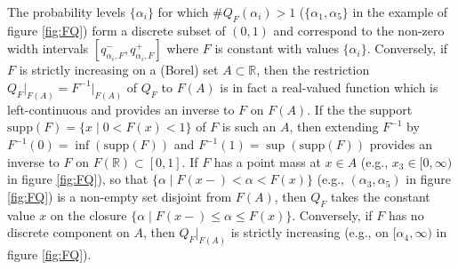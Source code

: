 \documentclass{article}\usepackage[]{graphicx}\usepackage[]{xcolor}
\begin{document}
The probability levels $\{\alpha_i\}$ for which $\#Q_F(\alpha_i)>1$ ($\{\alpha_1, \alpha_5\}$ in the example of figure \ref{fig:FQ}) form a 
discrete subset of $(0,1)$ and correspond to
the non-zero width intervals $[q_{\alpha_i,F}^{-},q_{\alpha_i,F}^{+}]$ where $F$ is constant with values 
$\{\alpha_i\}$.  Conversely, if $F$ is strictly increasing on a (Borel) set $A\subset \mathbb{R}$, then the restriction
$Q_{F}\big|_{F(A)}=F^{-1}\big|_{F(A)}$ of $Q_F$ to $F(A)$ is in fact a real-valued function which is left-continuous
and provides an inverse to $F$ on $F(A)$. If the the support $\mathrm{supp}(F) = \{x \mid 0<F(x)<1\}$ of $F$ is such an
$A$, then extending $F^{-1}$ by $F^{-1}(0)=\inf(\mathrm{supp}(F))$ and $F^{-1}(1)=\sup(\mathrm{supp}(F))$ provides an
inverse to $F$ on $F(\mathbb{R})\subset [0,1]$. If $F$ has a point mass at $x\in A$ (e.g., $x_3 \in [0,\infty)$ in figure \ref{fig:FQ}),
so that $\{\alpha \mid F(x-)< \alpha < F(x)\}$ (e.g., $(\alpha_3, \alpha_5)$ in figure \ref{fig:FQ}) is a 
non-empty set disjoint from $F(A)$,
then $Q_F$ takes the constant value $x$ 
on the closure $\{\alpha \mid F(x-)\leq \alpha \leq F(x)\}$. Conversely, if $F$ has no discrete component on $A$, 
then $Q_{F}\big|_{F(A)}$ is strictly increasing (e.g., on $[\alpha_4, \infty)$ in figure \ref{fig:FQ}).
\end{document}
